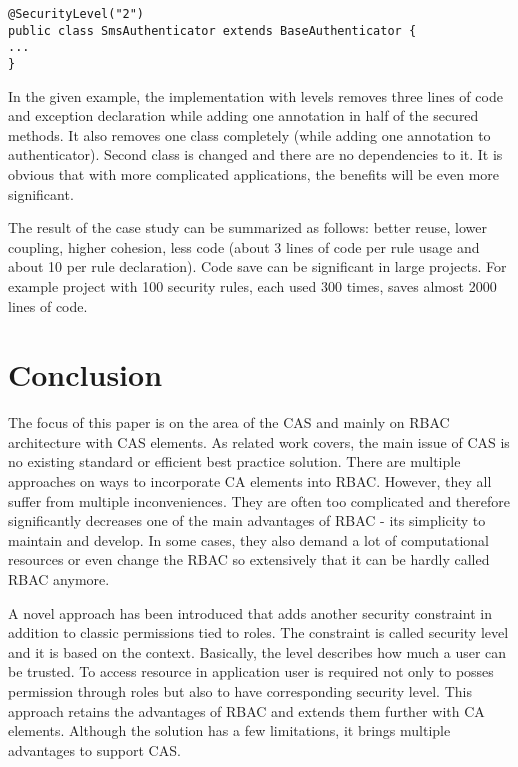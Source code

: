 \documentclass{sig-alternate}
\begin{document}
\begin{lstlisting}[]
@SecurityLevel("2")
public class SmsAuthenticator extends BaseAuthenticator {
...
}
\end{lstlisting}

In the given example, the implementation with levels removes three lines of code and exception declaration while adding one annotation in half of the secured methods. It also removes one class completely (while adding one annotation to authenticator). Second class is changed and there are no dependencies to it. It is obvious that with more complicated applications, the benefits will be even more significant.

The result of the case study can be summarized as follows: better reuse, lower coupling, higher cohesion, less code (about 3 lines of code per rule usage and about 10 per rule declaration). Code save can be significant in large projects. For example project with 100 security rules, each used 300 times, saves almost 2000 lines of code.

\section{Conclusion}
The focus of this paper is on the area of the CAS and mainly on RBAC architecture with CAS elements. As related work covers, the main issue of CAS is no existing standard or efficient best practice solution. There are multiple approaches on ways to incorporate CA elements into RBAC. However, they all suffer from multiple inconveniences. They are often too complicated and therefore significantly decreases one of the main advantages of RBAC - its simplicity to maintain and develop. In some cases, they also demand a lot of computational resources or even change the RBAC so extensively that it can be hardly called RBAC anymore.

A novel approach has been introduced that adds another security constraint in addition to classic permissions tied to roles. The constraint is called security level and it is based on the context. Basically, the level describes how much a user can be trusted. To access resource in application user is required not only to posses permission through roles but also to have corresponding security level. This approach retains the advantages of RBAC and extends them further with CA elements. Although the solution has a few limitations, it brings multiple advantages to support CAS. 
\end{document}
